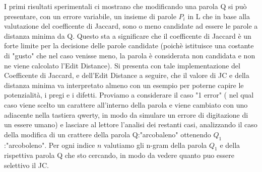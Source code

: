 \documentclass{article}
\begin{document}
I primi risultati sperimentali ci mostrano che modificando una parola Q si può presentare, con un errore variabile, un insieme di parole $P_i$ in L che in base alla valutazione del coefficente di Jaccard, sono o meno candidate ad essere le parole a distanza minima da Q. Questo sta a significare che il coefficente di Jaccard è un forte limite per la decisione delle parole candidate (poichè istituisce una costante di "gusto" che nel caso venisse meno, la parola è considerata non candidata e non ne viene calcolato l'Edit Distance). 
Si presenta con tale implementazione del Coefficente di Jaccard, e dell'Edit Distance a seguire, che il valore di JC e della distanza minima va interpretato almeno con un esempio per poterne capire le potenzialità, i pregi e i difetti.
Proviamo a considerare il caso "1 error" ( nel qual caso viene scelto un carattere all'interno della parola e viene cambiato con uno adiacente nella tastiera qwerty, in modo da simulare un errore di digitazione di un essere umano) e lasciare al lettore l'analisi dei restanti casi, analizzando il caso della modifica di un crattere della parola Q:"arcobaleno" ottenendo $Q_1$:"arcoboleno".
Per ogni indice $n$ valutiamo gli n-gram della parola $Q_1$ e della rispettiva parola Q che sto cercando, in modo da vedere quanto puo essere selettivo il JC.
\end{document}
